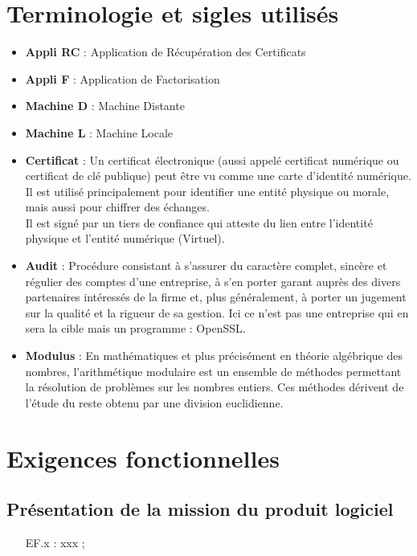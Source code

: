\documentclass[a4paper,11pt,french]{article}
\begin{document}
\section{Terminologie et sigles utilisés}
\begin{itemize}
	\item \textbf{Appli RC} : Application de Récupération des Certificats
	\item \textbf{Appli F} : Application de Factorisation
	\item \textbf{Machine D} : Machine Distante
	\item \textbf{Machine L} : Machine Locale
	\item \textbf{Certificat} : Un certificat électronique (aussi appelé certificat numérique ou certificat de clé publique) peut être vu comme une carte d'identité numérique. Il est utilisé principalement pour identifier une entité physique ou morale, mais aussi pour chiffrer des échanges. \\Il est signé par un tiers de confiance qui atteste du lien entre l'identité physique et l'entité numérique (Virtuel).
	\item \textbf{Audit} : Procédure consistant à s'assurer du caractère complet, sincère et régulier des comptes d'une entreprise, à s'en porter garant auprès des divers partenaires intéressés de la firme et, plus généralement, à porter un jugement sur la qualité et la rigueur de sa gestion. Ici ce n'est pas une entreprise qui en sera la cible mais un programme : OpenSSL.
	\item \textbf{Modulus} : En mathématiques et plus précisément en théorie algébrique des nombres, l’arithmétique modulaire est un ensemble de méthodes permettant la résolution de problèmes sur les nombres entiers. Ces méthodes dérivent de l’étude du reste obtenu par une division euclidienne.
\end{itemize}

\section{Exigences fonctionnelles}
\subsection{Présentation de la mission du produit logiciel}
\begin{itemize}
\item [EF.x] : xxx ;
\end{itemize}
\end{document}
